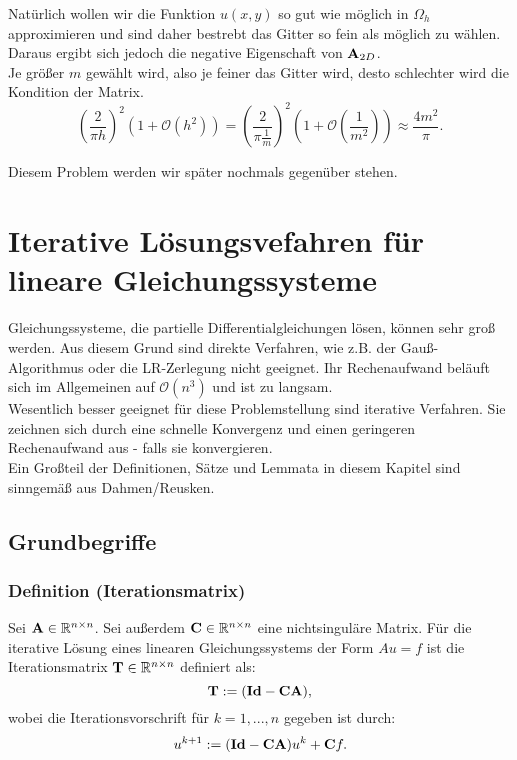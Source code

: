 Natürlich wollen wir die Funktion $u(x,y)$ so gut wie möglich in $\Omega_{h}$ approximieren und sind daher bestrebt das Gitter so fein als möglich zu wählen. Daraus ergibt sich jedoch die negative Eigenschaft von ${\textbf{A}}_{2D}$. \\
Je größer $m$ gewählt wird, also je feiner das Gitter wird, desto schlechter wird die Kondition der Matrix.
\begin{equation}
\left( \frac {2} {\pi h} \right)^{2} (1 + \mathcal{O}(h^{2})) = \left( \frac {2} {\pi \frac {1} {m}} \right)^{2} (1 + \mathcal{O}(\frac {1} {m^{2}})) \approx \frac {4m^{2}} {\pi}.
\end{equation}

Diesem Problem werden wir später nochmals gegenüber stehen.

\chapter{Iterative Lösungsvefahren für lineare Gleichungssysteme}\label{c.IterativeVerfahren}

Gleichungssysteme, die partielle Differentialgleichungen lösen, können sehr groß werden. Aus diesem Grund sind direkte Verfahren, wie z.B. der Gauß-Algorithmus oder die LR-Zerlegung nicht geeignet. Ihr Rechenaufwand beläuft sich im Allgemeinen auf $\mathcal{O}(n^{3})$ und ist zu langsam.\\
Wesentlich besser geeignet für diese Problemstellung sind iterative Verfahren. Sie zeichnen sich durch eine schnelle Konvergenz und einen geringeren Rechenaufwand aus - falls sie konvergieren.\\
Ein Großteil der Definitionen, Sätze und Lemmata in diesem Kapitel sind sinngemäß aus Dahmen/Reusken.

\section{Grundbegriffe}\label{s.Grundbegriffe}

\subsection{Definition (Iterationsmatrix)}\label{ss.Iterationsmatrix}

Sei ${\textbf{A}} \in \mathbb{R}^{n \times n}$. Sei außerdem ${\textbf{C}} \in \mathbb{R}^{n \times n}$ eine nichtsinguläre Matrix. Für die iterative Lösung eines linearen Gleichungssystems der Form $Au = f$ ist die Iterationsmatrix ${\textbf{T}} \in \mathbb{R}^{n \times n}$ definiert als:
\begin{equation}
{\textbf{T}} := ({\textbf{Id}} - {\textbf{C}} {\textbf{A}}),
\end{equation}
wobei die Iterationsvorschrift für $k=1,...,n$ gegeben ist durch:
\begin{equation}
u^{k+1} := ({\textbf{Id}} - {\textbf{C}} {\textbf{A}})u^{k} + {\textbf{C}} f.\label{eq.Iteratives Verfahren}
\end{equation}


